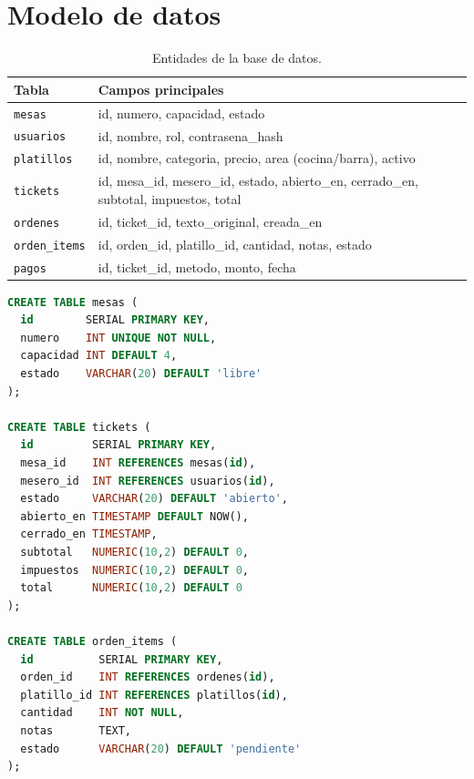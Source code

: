 \documentclass[11pt,letterpaper]{article}
\newcommand{\tabhead}[1]{\textbf{\color{white}#1}}
\newcommand{\encabezado}{\rowcolor{azulprincipal}}
\begin{document}
\section{Modelo de datos}
\begin{table}[h!]
\centering
\begin{tabularx}{\textwidth}{l X}
\toprule
\encabezado \tabhead{Tabla} & \tabhead{Campos principales} \\
\midrule
\texttt{mesas} & id, numero, capacidad, estado \\
\texttt{usuarios} & id, nombre, rol, contrasena\_hash \\
\texttt{platillos} & id, nombre, categoria, precio, area (cocina/barra), activo \\
\texttt{tickets} & id, mesa\_id, mesero\_id, estado, abierto\_en, cerrado\_en, subtotal, impuestos, total \\
\texttt{ordenes} & id, ticket\_id, texto\_original, creada\_en \\
\texttt{orden\_items} & id, orden\_id, platillo\_id, cantidad, notas, estado \\
\texttt{pagos} & id, ticket\_id, metodo, monto, fecha \\
\bottomrule
\end{tabularx}
\caption{Entidades de la base de datos.}
\end{table}

\begin{lstlisting}[language=SQL, caption={Fragmento del esquema SQL (PostgreSQL).}]
CREATE TABLE mesas (
  id        SERIAL PRIMARY KEY,
  numero    INT UNIQUE NOT NULL,
  capacidad INT DEFAULT 4,
  estado    VARCHAR(20) DEFAULT 'libre'
);

CREATE TABLE tickets (
  id         SERIAL PRIMARY KEY,
  mesa_id    INT REFERENCES mesas(id),
  mesero_id  INT REFERENCES usuarios(id),
  estado     VARCHAR(20) DEFAULT 'abierto',
  abierto_en TIMESTAMP DEFAULT NOW(),
  cerrado_en TIMESTAMP,
  subtotal   NUMERIC(10,2) DEFAULT 0,
  impuestos  NUMERIC(10,2) DEFAULT 0,
  total      NUMERIC(10,2) DEFAULT 0
);

CREATE TABLE orden_items (
  id          SERIAL PRIMARY KEY,
  orden_id    INT REFERENCES ordenes(id),
  platillo_id INT REFERENCES platillos(id),
  cantidad    INT NOT NULL,
  notas       TEXT,
  estado      VARCHAR(20) DEFAULT 'pendiente'
);
\end{lstlisting}

\end{document}
